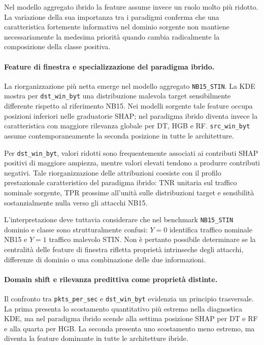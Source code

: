 Nel modello aggregato ibrido la feature assume invece un ruolo molto più ridotto. 
La variazione della sua importanza tra i paradigmi conferma che una caratteristica fortemente informativa nel dominio sorgente non mantiene necessariamente la medesima priorità quando cambia radicalmente la composizione della classe positiva.

\paragraph{Feature di finestra e specializzazione del paradigma ibrido.}
La riorganizzazione più netta emerge nel modello aggregato \texttt{NB15\_STIN}. 
La KDE mostra per \texttt{dst\_win\_byt} una distribuzione malevola target sensibilmente differente rispetto al riferimento NB15. 
Nei modelli sorgente tale feature occupa posizioni inferiori nelle graduatorie SHAP; nel paradigma ibrido diventa invece la caratteristica con maggiore rilevanza globale per DT, HGB e RF. 
\texttt{src\_win\_byt} assume contemporaneamente la seconda posizione in tutte le architetture.

Per \texttt{dst\_win\_byt}, valori ridotti sono frequentemente associati ai contributi SHAP positivi di maggiore ampiezza, mentre valori elevati tendono a produrre contributi negativi. 
Tale riorganizzazione delle attribuzioni coesiste con il profilo prestazionale caratteristico del paradigma ibrido: TNR unitaria sul traffico nominale sorgente, TPR prossime all'unità sulle distribuzioni target e sensibilità sostanzialmente nulla verso gli attacchi NB15.

L'interpretazione deve tuttavia considerare che nel benchmark \texttt{NB15\_STIN} dominio e classe sono strutturalmente confusi: $Y=0$ identifica traffico nominale NB15 e $Y=1$ traffico malevolo STIN.
Non è pertanto possibile determinare se la centralità delle feature di finestra rifletta proprietà intrinseche degli attacchi, differenze di dominio o una combinazione delle due informazioni.

\paragraph{Domain shift e rilevanza predittiva come proprietà distinte.}
Il confronto tra \texttt{pkts\_per\_sec} e \texttt{dst\_win\_byt} evidenzia un principio trasversale. 
La prima presenta lo scostamento quantitativo più estremo nella diagnostica KDE, ma nel paradigma ibrido scende alla settima posizione SHAP per DT e RF e alla quarta per HGB. 
La seconda presenta uno scostamento meno estremo, ma diventa la feature dominante in tutte le architetture ibride.


